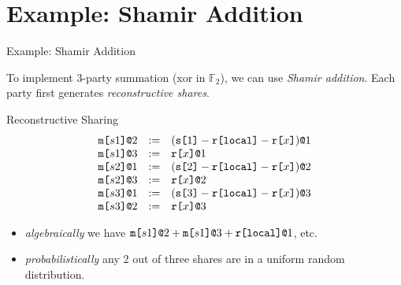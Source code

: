\documentclass{beamer}
\begin{document}
\section{Example: Shamir Addition}
\begin{frame}{Example: Shamir Addition}

  To implement 3-party summation (xor in $\mathbb{F}_2$), we can use \emph{Shamir addition}.
  Each party first generates \emph{reconstructive shares}.
  
  \begin{block}{Reconstructive Sharing}
    $$
    \begin{array}{lll}
      \texttt{m[}s1\texttt{]}\texttt{@}2 &:=& (\texttt{s[}1\texttt{]} - \texttt{r[}\mathtt{local}\texttt{]} - \texttt{r[}x\texttt{]})\texttt{@}1 \\ 
      \texttt{m[}s1\texttt{]}\texttt{@}3 &:=& \texttt{r[}x\texttt{]}\texttt{@}1 \\ 
      \texttt{m[}s2\texttt{]}\texttt{@}1 &:=& (\texttt{s[}2\texttt{]} - \texttt{r[}\mathtt{local}\texttt{]} - \texttt{r[}x\texttt{]})\texttt{@}2 \\ 
      \texttt{m[}s2\texttt{]}\texttt{@}3 &:=& \texttt{r[}x\texttt{]}\texttt{@}2 \\ 
      \texttt{m[}s3\texttt{]}\texttt{@}1 &:=& (\texttt{s[}3\texttt{]} - \texttt{r[}\mathtt{local}\texttt{]} - \texttt{r[}x\texttt{]})\texttt{@}3 \\ 
      \texttt{m[}s3\texttt{]}\texttt{@}2 &:=& \texttt{r[}x\texttt{]}\texttt{@}3
    \end{array}
    $$
  \end{block}
  \begin{itemize}
  \item \emph{algebraically} we have $\texttt{m[}s1\texttt{]}\texttt{@}2 + \texttt{m[}s1\texttt{]}\texttt{@}3 + \texttt{r[}\mathtt{local}\texttt{]}\texttt{@}1$, etc.
  \item \emph{probabilistically} any 2 out of three shares are in a uniform random distribution.
  \end{itemize}
  
\end{frame}
\end{document}
